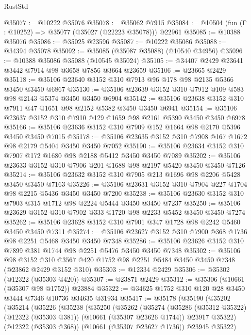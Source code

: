 \begin{lexlean}{RustStd}
\begin{coremodule}
@35077 := @10222 @35076
@35078 := @35062 @7915
@35084 := @10504 (fun (Γ : @10252) => @35077 (@35027 (@22223 @35078))) @22961
@35085 := @10388 @35076
@35086 := @35025 @23596
@35087 := @10222 @35086
@35088 := @34394 @35078
@35092 := @35085 (@35087 @35088) (@10540 @34956)
@35096 := @10388 @35086 @35088 (@10545 @35024)
@35105 := @34407 @2429 @23641 @3442 @7914 @98 @3658 @7856 @3664 @23659
@35106 := @23665 @2429
@35118 := @35106 @23640 @3152 @310 @7913 @96 @178 @98 @2135 @5366 @3450 @3450 @6867
@35130 := @35106 @23639 @3152 @310 @7912 @109 @583 @98 @2143 @5374 @3450 @3450 @6904
@35142 := @35106 @23638 @3152 @310 @7911 @47 @1651 @98 @2152 @5382 @3450 @3450 @6941
@35154 := @35106 @23637 @3152 @310 @7910 @129 @1659 @98 @2161 @5390 @3450 @3450 @6978
@35166 := @35106 @23636 @3152 @310 @7909 @152 @1664 @98 @2170 @5396 @3450 @3450 @7015
@35178 := @35106 @23635 @3152 @310 @7908 @167 @1672 @98 @2179 @5404 @3450 @3450 @7052
@35190 := @35106 @23634 @3152 @310 @7907 @172 @1680 @98 @2188 @5412 @3450 @3450 @7089
@35202 := @35106 @23633 @3152 @310 @7906 @201 @1688 @98 @2197 @5420 @3450 @3450 @7126
@35214 := @35106 @23632 @3152 @310 @7905 @213 @1696 @98 @2206 @5428 @3450 @3450 @7163
@35226 := @35106 @23631 @3152 @310 @7904 @227 @1704 @98 @2215 @5436 @3450 @3450 @7200
@35238 := @35106 @23630 @3152 @310 @7903 @315 @1712 @98 @2224 @5444 @3450 @3450 @7237
@35250 := @35106 @23629 @3152 @310 @7902 @333 @1720 @98 @2233 @5452 @3450 @3450 @7274
@35262 := @35106 @23628 @3152 @310 @7901 @347 @1728 @98 @2242 @5460 @3450 @3450 @7311
@35274 := @35106 @23627 @3152 @310 @7900 @368 @1736 @98 @2251 @5468 @3450 @3450 @7348
@35286 := @35106 @23626 @3152 @310 @7899 @381 @1744 @98 @2251 @5476 @3450 @3450 @7348
@35302 := @35106
    @98
    @3152
    @310
    @3567
    @420
    @1752
    @98
    @2251
    @5484
    @3450
    @3450
    @7348
    (@23862 @2429 @3152 @310)
@35303 := @12334 @2429
@35306 := @35302 (@12322 (@35303 @420))
@35307 := @23871 @2429
@35312 := @35306 (@10661 (@35307 @98 @1752)) @23884
@35322 := @34625 @1752 @310 @120 @28 @3450 @3444 @7346 @10736 @34635 @31934
@35417 := @35178
    (@35190
      (@35202
        (@35214
          (@35226
            (@35238
              (@35250
                (@35262
                  (@35274
                    (@35286
                      (@35312 @35322)
                      (@12322 (@35303 @381))
                      (@10661 (@35307 @23626 @1744))
                      @23917
                      @35322)
                    (@12322 (@35303 @368))
                    (@10661 (@35307 @23627 @1736))
                    @23945
                    @35322)

\end{coremodule}
\end{lexlean}
